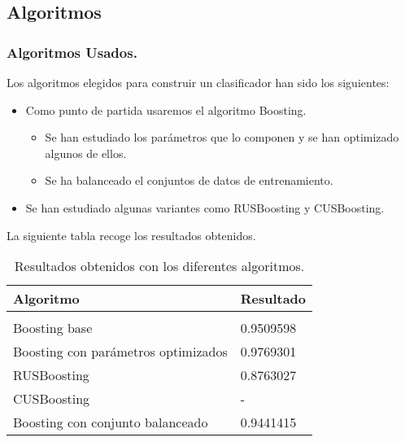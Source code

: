 \documentclass{beamer}
\theoremstyle{plain}
\theoremstyle{definition}
\theoremstyle{plain}
\theoremstyle{definition}
\theoremstyle{remark}
\theoremstyle{definition}
\begin{document}
\subsection{Algoritmos}
\begin{frame}
	\tableofcontents[currentsubsection]
\end{frame}
	\begin{frame}
		\frametitle{Algoritmos Usados.}
		Los algoritmos elegidos para construir un clasificador han sido los siguientes:
	\begin{itemize}
		\item Como punto de partida usaremos el algoritmo Boosting.
			\begin{itemize}
				\item Se han estudiado los parámetros que lo componen y se han optimizado algunos de ellos.
				\item Se ha balanceado el conjuntos de datos de entrenamiento.
			\end{itemize} 
		\item Se han estudiado algunas variantes como RUSBoosting y CUSBoosting.
	\end{itemize}
	\end{frame}
\begin{frame}
	La siguiente tabla recoge los resultados obtenidos.
	\begin{table}[H]
		\centering
		\begin{tabular}{ll}
			\textbf{Algoritmo}& \textbf{Resultado} \\
			\hline
			\\
			Boosting base&    0.9509598  \\
			Boosting con parámetros optimizados& 0.9769301 \\
			RUSBoosting & 0.8763027 \\
			CUSBoosting &  -  \\
			Boosting con conjunto balanceado & 0.9441415  \\
		\end{tabular}
		\caption{Resultados obtenidos con los diferentes algoritmos.}
	\end{table}
\end{frame}
\end{document}
